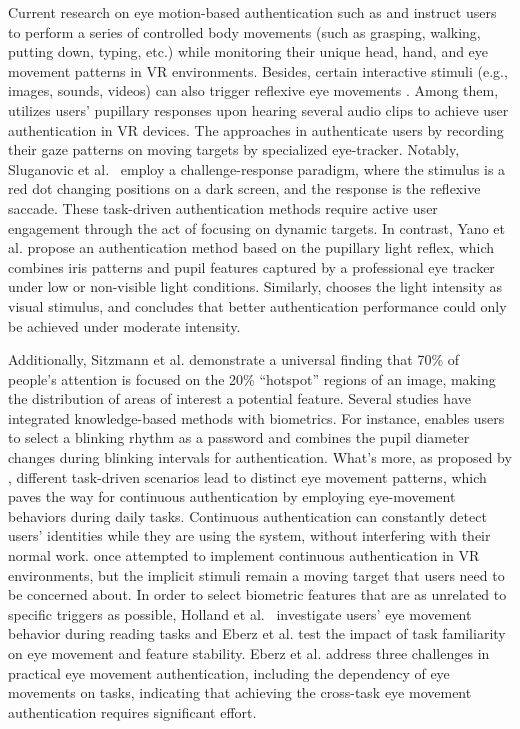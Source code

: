 \documentclass[sigconf]{acmart}
\begin{document}
Current research on eye motion-based authentication such as \cite{PfeufferCHI19} and \cite{BioMove} instruct users to perform a series of controlled body movements (such as grasping, walking, putting down, typing, etc.) while monitoring their unique head, hand, and eye movement patterns in VR environments. Besides, certain interactive stimuli (e.g., images, sounds, videos) can also trigger reflexive eye movements \cite{ReflexiveEM_CCS16,IeeeTO,Eberz2015PreventingLA,Zhu2023SoundLockAN}. Among them, \cite{Zhu2023SoundLockAN} utilizes users' pupillary responses upon hearing several audio clips to achieve user authentication in VR devices. The approaches in \cite{ReflexiveEM_CCS16,IeeeTO,Eberz2015PreventingLA} authenticate users by recording their gaze patterns on moving targets by specialized eye-tracker. Notably, Sluganovic et al.~\cite{ReflexiveEM_CCS16} employ a challenge-response paradigm, where the stimulus is a red dot changing positions on a dark screen, and the response is the reflexive saccade. These task-driven authentication methods require active user engagement through the act of focusing on dynamic targets. In contrast, Yano et al. \cite{YANO201541} propose an authentication method based on the pupillary light reflex, which combines iris patterns and pupil features captured by a professional eye tracker under low or non-visible light conditions. Similarly, \cite{Yan2020} chooses the light intensity as visual stimulus, and concludes that better authentication performance could only be achieved under moderate intensity. 

Additionally, Sitzmann et al. \cite{Saliency} demonstrate a universal finding that 70\% of people's attention is focused on the 20\% ``hotspot'' regions of an image, making the distribution of areas of interest a potential feature. Several studies have integrated knowledge-based methods with biometrics. For instance, \cite{zhu2020blinkey} enables users to select a blinking rhythm as a password and combines the pupil diameter changes during blinking intervals for authentication. What's more, as proposed by \cite{Yarbus}, different task-driven scenarios lead to distinct eye movement patterns, which paves the way for continuous authentication by employing eye-movement behaviors during daily tasks. Continuous authentication can constantly detect users' identities while they are using the system, without interfering with their normal work. \cite{ContinuousAuth} once attempted to implement continuous authentication in VR environments, but the implicit stimuli remain a moving target that users need to be concerned about. In order to select biometric features that are as unrelated to specific triggers as possible, Holland et al.~\cite{ICB_Reading,IGCB_Reading} investigate users' eye movement behavior during reading tasks and Eberz et al. \cite{Eberz2016LooksLE} test the impact of task familiarity on eye movement and feature stability. Eberz et al. \cite{28Blinks_CCS19} address three challenges in practical eye movement authentication, including the dependency of eye movements on tasks, indicating that achieving the cross-task eye movement authentication requires significant effort. 
\end{document}
